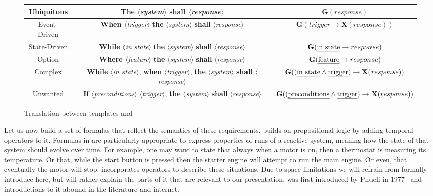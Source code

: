 \begin{figure}
\begin{tabular}{ |c|c|c| } 
 \hline
Ubiquitous & \textbf{The} $\langle$\emph{system}$\rangle$ \textbf{shall}
$\langle$\emph{response}$\rangle$ & $\mathbf{G}(response)$
\\
  \hline
Event-Driven & \textbf{When} $\langle$\emph{trigger}$\rangle$ \textbf{the}
$\langle$\emph{system}$\rangle$ \textbf{shall} $\langle$\emph{response}$\rangle$
& $\mathbf{G}(trigger\rightarrow \textbf{X}(response))$
\\
 \hline 
State-Driven &  \textbf{While} $\langle$\emph{in state}$\rangle$ \textbf{the}
$\langle$\emph{system}$\rangle$ \textbf{shall} $\langle$\emph{response}$\rangle$
& $\mathbf{G}(\text{\emph{in state}}\rightarrow response)$ \\
 \hline

Option &  \textbf{Where} $\langle$\emph{feature}$\rangle$ \textbf{the}
$\langle$\emph{system}$\rangle$ \textbf{shall} $\langle$\emph{response}$\rangle$
& $\mathbf{G}(\text{\emph{feature}}\rightarrow response)$ \\
 \hline
 
Complex &  \textbf{While} $\langle$\emph{in state}$\rangle$, \textbf{when}
$\langle$\emph{trigger}$\rangle$, \textbf{the} $\langle$\emph{system}$\rangle$
\textbf{shall} $\langle$\emph{response}$\rangle$ & $\mathbf{G}((\text{\emph{in
state}} \land \text{\emph{trigger}})\rightarrow \textbf{X}(response))$ \\
 \hline
 
Unwanted &  \textbf{If} $\langle$\emph{preconditions}$\rangle$
$\langle$\emph{trigger}$\rangle$, \textbf{the} $\langle$\emph{system}$\rangle$
\textbf{shall} $\langle$\emph{response}$\rangle$ &
$\mathbf{G}((\text{\emph{preconditions}} \land \text{\emph{trigger}})\rightarrow
\textbf{X}(response))$ \\
 \hline
 
\end{tabular}
\caption{Translation between \ears templates and \ltl}
\label{fig:translation_ears_ltl}
\end{figure}

Let us now build a set of \ltl formulas that reflect the semantics of these
requirements. \ltl builds on propositional logic by adding temporal operators to
it. Formulas in \ltl are particularly appropriate to express properties of
runs of a reactive system, meaning how the state of that system should evolve
over time. For example, one may want to state that always when a motor is on,
then a thermostat is measuring its temperature. Or that, while the start button
is pressed then the starter engine will attempt to run the main engine. Or
even, that eventually the motor will stop. \ltl incorporates operators to
describe these situations. Due to space limitations we will refrain from 
formally introduce \ltl here, but will rather explain the parts of it that are
relevant to our presentation. \ltl was first introduced by Pnueli in
1977~\cite{Pnueli77} and introductions to it abound in the literature and
internet.

